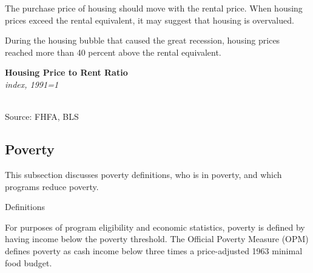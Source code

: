 \documentclass{report}
\makeatletter
\newcommand{\tbllink}[1]{\href{https://raw.githubusercontent.com/bdecon/US-chartbook/master/chartbook/data/#1}{\faTable}}
\newcommand*\short[1]{\expandafter\@gobbletwo\number\numexpr#1\relax}
\newcommand{\shdateaxisticks}{
		date coordinates in=x, axis line style={draw=none},
		xmax={2024-01-31},
		max space between ticks=40,	    
		xtick={{1990-01-01}, {1995-01-01}, {2000-01-01}, 
			{2005-01-01}, {2010-01-01}, {2015-01-01}, {2020-01-01}},
		minor xtick={},
		enlarge y limits={0.06}, enlarge x limits={0.01},
		xticklabel style={align=center, yshift=-2pt}, tick label style={inner sep=0pt},
		}
\newcommand{\bbar}[2]{extra #1 ticks = {{#2}}, extra #1 tick labels = ,
		extra #1 tick style = {grid=major, grid style={thick, black!25}},}
\newcommand{\stdline}[4]{\addplot[very thick, no markers, color=#1] 
		table [x=#2, y=#3, col sep=comma] {#4};	}
\newcommand{\rebars}{
		\fill[color=black!10] (axis cs:{2007-12-01},\pgfkeysvalueof{/pgfplots/ymin}) 
			rectangle (axis cs:{2009-07-01}, \pgfkeysvalueof{/pgfplots/ymax});
		\fill[color=black!10] (axis cs:{2001-03-01},\pgfkeysvalueof{/pgfplots/ymin}) 
			rectangle (axis cs:{2001-11-01}, \pgfkeysvalueof{/pgfplots/ymax});
		\fill[color=black!10] (axis cs:{2020-02-01},\pgfkeysvalueof{/pgfplots/ymin}) 
			rectangle (axis cs:{2020-05-01}, \pgfkeysvalueof{/pgfplots/ymax});}
\makeatother
\begin{document}
{\begin{minipage}{0.33\textwidth}
\small The purchase price of housing should move with the rental price. When housing prices exceed the rental equivalent, it may suggest that housing is overvalued. 

During the housing bubble that caused the great recession, housing prices reached more than 40 percent above the rental equivalent. 
\end{minipage}\hspace{7mm}
\begin{minipage}{0.37\textwidth}
\normalsize \textbf{Housing Price to Rent Ratio}\\
\footnotesize{\textit{index, 1991=1}}\\
\hspace*{-1mm} \\
\footnotesize{Source: FHFA, BLS} \hfill \tbllink{hpi_rent_ratio.csv} 
\end{minipage}
\newpage
\vspace*{-10mm}

\begin{minipage}{1.0\textwidth} 
\subsection*{Poverty}
\hypertarget{hhpov}{\label{hhpov}}
\small %
 This subsection discusses poverty definitions, who is in poverty, and which programs reduce poverty.

\vspace{0.5mm}
\normalsize Definitions
\vspace{-0.5mm}

\small For purposes of program eligibility and economic statistics, poverty is defined by having income below the poverty threshold. The Official Poverty Measure (OPM) defines poverty as cash income below three times a price-adjusted 1963 minimal food budget. 


\end{minipage}}
\end{document}
